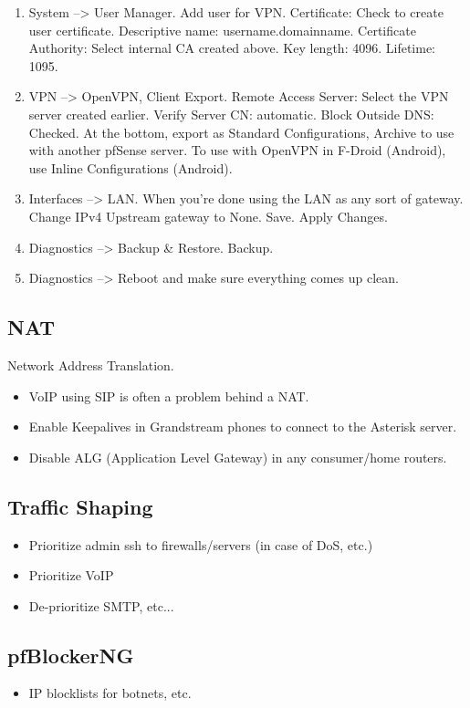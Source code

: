 \begin{enumerate}
 \item System --> User Manager. Add user for VPN. Certificate: Check to create user certificate. Descriptive name: username.domainname. Certificate Authority: Select internal CA created above. Key length: 4096. Lifetime: 1095.
 \item VPN --> OpenVPN, Client Export. Remote Access Server: Select the VPN server created earlier. Verify Server CN: automatic. Block Outside DNS: Checked. At the bottom, export as Standard Configurations, Archive to use with another pfSense server. To use with OpenVPN in F-Droid (Android), use Inline Configurations (Android).



 \item Interfaces --> LAN. When you're done using the LAN as any sort of gateway. Change IPv4 Upstream gateway to None. Save. Apply Changes.
 \item Diagnostics --> Backup \& Restore. Backup.
 \item Diagnostics --> Reboot and make sure everything comes up clean.
\end{enumerate}


\subsection{NAT}
Network Address Translation.

\begin{itemize}
 \item VoIP using SIP is often a problem behind a NAT.
 \item Enable Keepalives in Grandstream phones to connect to the Asterisk server.
 \item Disable ALG (Application Level Gateway) in any consumer/home routers.
\end{itemize}


\subsection{Traffic Shaping}
\begin{itemize}
 \item Prioritize admin ssh to firewalls/servers (in case of DoS, etc.)
 \item Prioritize VoIP
 \item De-prioritize SMTP, etc...
\end{itemize}

\subsection{pfBlockerNG}
\begin{itemize}
 \item IP blocklists for botnets, etc.
\end{itemize}


